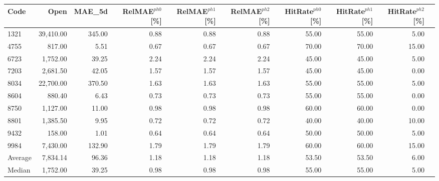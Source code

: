 \begingroup
\footnotesize
\begin{tabular}{lrrrrrrrrr}
\hline
Code & Open & MAE\_5d & RelMAE$^{ph0}$[\%] & RelMAE$^{ph1}$[\%] & RelMAE$^{ph2}$[\%] & HitRate$^{ph0}$[\%] & HitRate$^{ph1}$[\%] & HitRate$^{ph2}$[\%] \\
\hline
1321 & 39,410.00 & 345.00 & 0.88 & 0.88 & 0.88 & 55.00 & 55.00 & 5.00 \\
4755 & 817.00 & 5.51 & 0.67 & 0.67 & 0.67 & 70.00 & 70.00 & 15.00 \\
6723 & 1,752.00 & 39.25 & 2.24 & 2.24 & 2.24 & 45.00 & 45.00 & 5.00 \\
7203 & 2,681.50 & 42.05 & 1.57 & 1.57 & 1.57 & 45.00 & 45.00 & 0.00 \\
8034 & 22,700.00 & 370.50 & 1.63 & 1.63 & 1.63 & 55.00 & 55.00 & 5.00 \\
8604 & 880.40 & 6.43 & 0.73 & 0.73 & 0.73 & 55.00 & 55.00 & 0.00 \\
8750 & 1,127.00 & 11.00 & 0.98 & 0.98 & 0.98 & 60.00 & 60.00 & 0.00 \\
8801 & 1,385.50 & 9.95 & 0.72 & 0.72 & 0.72 & 40.00 & 40.00 & 10.00 \\
9432 & 158.00 & 1.01 & 0.64 & 0.64 & 0.64 & 50.00 & 50.00 & 5.00 \\
9984 & 7,430.00 & 132.90 & 1.79 & 1.79 & 1.79 & 60.00 & 60.00 & 15.00 \\
Average & 7,834.14 & 96.36 & 1.18 & 1.18 & 1.18 & 53.50 & 53.50 & 6.00 \\
Median & 1,752.00 & 39.25 & 0.98 & 0.98 & 0.98 & 55.00 & 55.00 & 5.00 \\
\hline
\end{tabular}
\endgroup